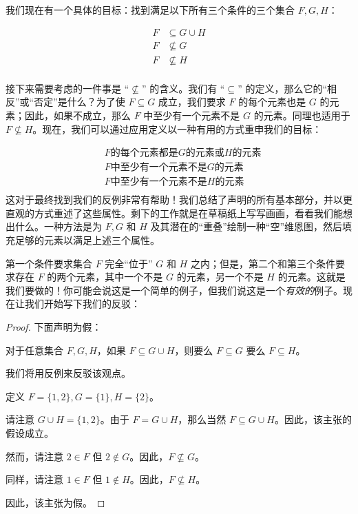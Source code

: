 我们现在有一个具体的目标：找到满足以下所有三个条件的三个集合 $F,G,H$：

\begin{align*}
    F &\subseteq G \cup H \\
    F &\not\subseteq G \\
    F &\not\subseteq H \\
\end{align*}

接下来需要考虑的一件事是 ``$\not\subseteq$'' 的含义。我们有 ``$\subseteq$'' 的定义，那么它的``相反''或``否定''是什么？为了使 $F \subseteq G$ 成立，我们要求 $F$ 的每个元素也是 $G$ 的元素；因此，如果不成立，那么 $F$ 中至少有一个元素不是 $G$ 的元素。同理也适用于 $F \not\subseteq H$。现在，我们可以通过应用定义以一种有用的方式重申我们的目标：

\begin{align*}
    &F \text{的每个元素都是} G \text{的元素或} H \text{的元素} \\
    &F \text{中至少有一个元素不是} G \text{的元素} \\
    &F \text{中至少有一个元素不是} H \text{的元素} \\
\end{align*}
这对于最终找到我们的反例非常有帮助！我们总结了声明的所有基本部分，并以更直观的方式重述了这些属性。剩下的工作就是在草稿纸上写写画画，看看我们能想出什么。一种方法是为 $F, G$ 和 $H$ 及其潜在的``重叠''绘制一种``空''维恩图，然后填充足够的元素以满足上述三个属性。

第一个条件要求集合 $F$ 完全``位于'' $G$ 和 $H$ 之内；但是，第二个和第三个条件要求存在 $F$ 的两个元素，其中一个不是 $G$ 的元素，另一个不是 $H$ 的元素。这就是我们要做的！你可能会说这是一个简单的例子，但我们说这是一个\emph{有效的}例子。现在让我们开始写下我们的反驳：

\begin{proof}
    下面声明为假：
    \begin{center}
        对于任意集合 $F, G, H$，如果 $F \subseteq G \cup H$，则要么 $F \subseteq G$ 要么 $F \subseteq H$。
    \end{center}
    我们将用反例来反驳该观点。

    定义 $F = \{1, 2\}, G = \{1\}, H = \{2\}$。

    请注意 $G \cup H = \{1, 2\}$。由于 $F = G \cup H$，那么当然 $F \subseteq G \cup H$。因此，该主张的假设成立。

    然而，请注意 $2 \in F$ 但 $2 \notin G$。因此，$F \not\subseteq G$。

    同样，请注意 $1 \in F$ 但 $1 \notin H$。因此，$F \not\subseteq H$。

    因此，该主张为假。
\end{proof}

